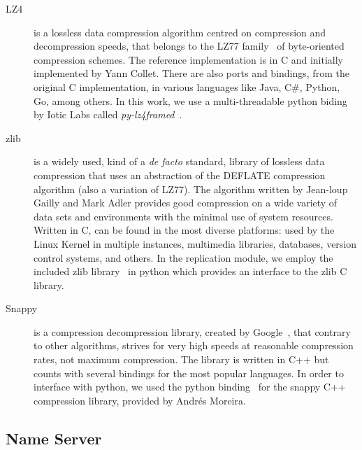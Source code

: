 \begin{description}
	\item [LZ4] is a lossless data compression algorithm centred on compression and decompression speeds, that belongs to the LZ77 family~\cite{lz77} of byte-oriented compression schemes. The reference implementation is in C and initially implemented by Yann Collet. There are also ports and bindings, from the original C implementation, in various languages like Java, C\#, Python, Go, among others. In this work, we use a multi-threadable python biding by Iotic Labs called \textit{py-lz4framed}~\cite{lz4framed}.
	\item [zlib] is a widely used, kind of a \textit{de facto} standard, library of lossless data compression that uses an abstraction of the DEFLATE compression algorithm (also a variation of LZ77). The algorithm written by Jean-loup Gailly and Mark Adler provides good compression on a wide variety of data sets and environments with the minimal use of system resources.~\cite{zlib} Written in C, can be found in the most diverse platforms: used by the Linux Kernel in multiple instances, multimedia libraries, databases, version control systems, and others. In the replication module, we employ the included zlib library~\cite{py_zlib} in python which provides an interface to the zlib C library.
	\item [Snappy] is a compression \/ decompression library, created by Google~\cite{snappy}, that contrary to other algorithms, strives for very high speeds at reasonable compression rates, not maximum compression. The library is written in C++ but counts with several bindings for the most popular languages. In order to interface with python, we used the python binding~\cite{py_snappy} for the snappy C++ compression library, provided by Andrés Moreira.
\end{description}

\subsection{Name Server}
\label{sub:rep_name_server}


